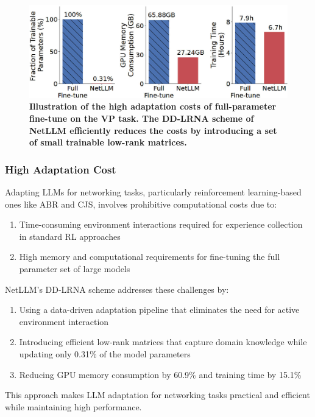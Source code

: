 \documentclass[twocolumn]{article}
\begin{document}
\begin{figure}[t]
  \centering
  \includegraphics[width=1\linewidth]{img/figure4.jpg}
  \caption{\textbf{Illustration of the high adaptation costs of full-parameter fine-tune on the VP task. The DD-LRNA scheme of NetLLM efficiently reduces the costs by introducing a set of small trainable low-rank matrices.}}
  \label{fig:4}
\end{figure}

\subsubsection{High Adaptation Cost}
Adapting LLMs for networking tasks, particularly reinforcement learning-based ones like ABR and CJS, involves prohibitive computational costs due to:

\begin{enumerate}[itemsep=0pt, topsep=2pt, parsep=0pt]
  \item Time-consuming environment interactions required for experience collection in standard RL approaches
  \item High memory and computational requirements for fine-tuning the full parameter set of large models
\end{enumerate}



NetLLM's DD-LRNA scheme addresses these challenges by:
\begin{enumerate}[itemsep=0pt, topsep=2pt, parsep=0pt]
  \item Using a data-driven adaptation pipeline that eliminates the need for active environment interaction
  \item Introducing efficient low-rank matrices that capture domain knowledge while updating only 0.31\% of the model parameters
  \item Reducing GPU memory consumption by 60.9\% and training time by 15.1\%
\end{enumerate}

This approach makes LLM adaptation for networking tasks practical and efficient while maintaining high performance.
\end{document}
